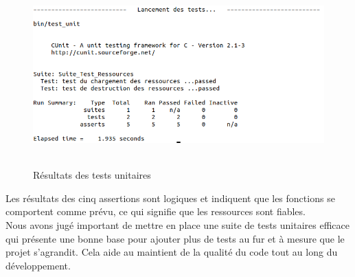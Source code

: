 \documentclass[a4paper,12pt]{article}
\begin{document}
\begin{appendices}
\begin{figure}[h]
	\centering
	\includegraphics[height=7cm]{img/capture_tests.png}
	\caption{Résultats des tests unitaires}
	\label{tests}
\end{figure}

Les résultats des cinq assertions sont logiques et indiquent que les fonctions se comportent comme prévu, ce qui signifie que les ressources sont fiables.\\
Nous avons jugé important de mettre en place une suite de tests unitaires efficace qui présente une bonne base pour ajouter plus de tests au fur et à mesure que le projet s'agrandit. Cela aide au maintient de la qualité du code tout au long du développement.

\end{appendices}
\end{document}

